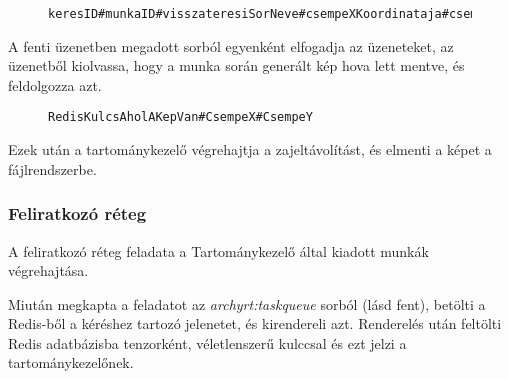 \begin{figure}[h]
    \centering
    \begin{minipage}{.7\textwidth}
        \begin{lstlisting}
keresID#munkaID#visszateresiSorNeve#csempeXKoordinataja#csempeYKoordinataja
        \end{lstlisting}
    \end{minipage}
\end{figure}


A fenti üzenetben megadott sorból egyenként elfogadja az üzeneteket, az üzenetből kiolvassa, hogy a munka során generált kép hova lett mentve, és feldolgozza azt.

\begin{figure}[h]
    \centering
    \begin{minipage}{.7\textwidth}
        \begin{lstlisting}
RedisKulcsAholAKepVan#CsempeX#CsempeY
        \end{lstlisting}
    \end{minipage}
\end{figure}

Ezek után a tartománykezelő végrehajtja a zajeltávolítást, és elmenti a képet a fájlrendszerbe.

\subsubsection{Feliratkozó réteg}
A feliratkozó réteg feladata a Tartománykezelő által kiadott munkák végrehajtása.

Miután megkapta a feladatot az \emph{archyrt:taskqueue} sorból (lásd fent), betölti a Redis-ből a kéréshez tartozó jelenetet, és kirendereli azt. Renderelés után feltölti Redis adatbázisba tenzorként, véletlenszerű kulccsal és ezt jelzi a tartománykezelőnek.